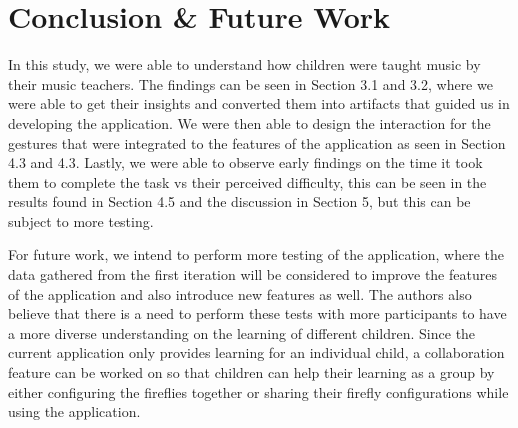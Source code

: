 

\section{Conclusion \& Future Work}


In this study, we were able to understand how children were taught music by their music teachers. The findings can be seen in Section 3.1 and 3.2, where we were able to get their insights and converted them into artifacts that guided us in developing the application. We were then able to design the interaction for the gestures that were integrated to the features of the application as seen in Section 4.3 and 4.3. Lastly, we were able to observe early findings on the time it took them to complete the task vs their perceived difficulty, this can be seen in the results found in Section 4.5 and the discussion in Section 5, but this can be subject to more testing.

For future work, we intend to perform more testing of the application, where the data gathered from the first iteration will be considered to improve the features of the application and also introduce new features as well. The authors also believe that there is a need to perform these tests with more participants to have a more diverse understanding on the learning of different children. Since the current application only provides learning for an individual child, a collaboration feature can be worked on so that children can help their learning as a group by either configuring the fireflies together or sharing their firefly configurations while using the application.


